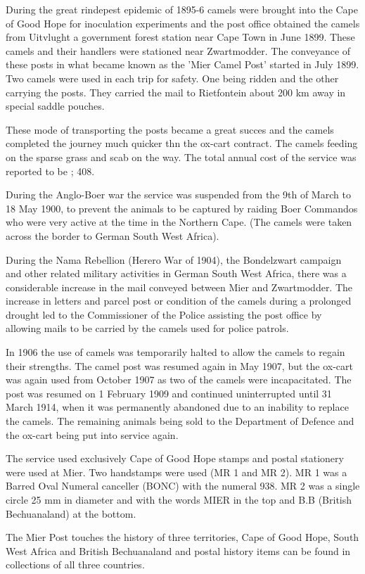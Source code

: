During the great rindepest epidemic of 1895-6 camels were brought into the Cape of Good Hope for inoculation experiments and the post office obtained the camels from Uitvlught a government forest station near Cape Town in June 1899. These camels and their handlers were stationed near Zwartmodder. The conveyance of these posts in what became known as the 'Mier Camel Post' started in July 1899. Two camels were used in each trip for safety. One being ridden and the other carrying the posts. They carried the mail to Rietfontein about 200 km away in special saddle pouches.

These mode of transporting the posts became a great succes and the camels completed the journey much quicker thn the ox-cart contract. The camels feeding on the sparse grass and scab on the way. The total annual cost of the service was 
reported to be \pound; 408.

During the Anglo-Boer war the service was suspended from the 9th of March to 18 May 1900, to prevent the animals to be captured by raiding Boer Commandos who 
were very active at the time in the Northern Cape. (The camels were taken across the border to German South West Africa).

During the Nama Rebellion (Herero War of 1904), the Bondelzwart campaign 
and other related military activities in German South West Africa, 
there was a considerable increase in the mail conveyed between 
Mier and Zwartmodder. The increase in letters and parcel post 
or condition of the camels during a prolonged drought led to the 
Commissioner of the Police assisting the post office by allowing 
mails to be carried by the camels used for police patrols.

In 1906 the use of camels was temporarily halted to allow the camels to regain their strengths. The camel post was resumed again in May 1907, but the ox-cart was again used from October 1907 as two of the camels were incapacitated. The post was resumed on 1 February 1909 and continued uninterrupted until 31 March 1914, when it was permanently abandoned due to an inability to replace the camels. The remaining animals being sold to the Department of Defence and the ox-cart being put into service again.

The service used exclusively Cape of Good Hope stamps and postal stationery were used at Mier. Two handstamps were used (MR 1 and MR 2). MR 1 was a Barred Oval Numeral canceller (BONC) with the numeral 938. MR 2 was a single circle 25 mm in diameter and with the words MIER in the top and B.B (British Bechuanaland) at the bottom.

The Mier Post touches the history of three territories, 
Cape of Good Hope, South West Africa and British Bechuanaland and postal 
history items can be found in collections of all three countries.

  

                      